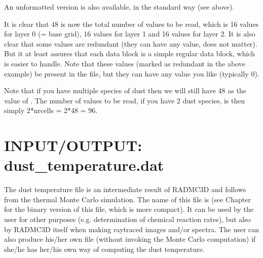 \documentclass[letterpaper,10pt,english]{sphinxmanual}
\begin{document}
\begin{sphinxVerbatim}[commandchars=\\\{\}]
\PYG{p}{[}\PYG{p}{]}
\PYG{p}{[}\PYG{p}{]}
\PYG{p}{[}\PYG{p}{]}
\PYG{p}{[}\PYG{p}{]}
\end{sphinxVerbatim}

An unformatted version is also available, in the standard way (see above).

It is clear that 48 is now the total number of values to be read, which is
16 values for layer 0 (= base grid), 16 values for layer 1 and 16 values
for layer 2. It is also clear that some values are redundant (they can
have any value, does not matter). But it at least assures that each data
block is a simple regular data block, which is easier to handle. Note that
these values (marked as redundant in the above example)  be
present in the file, but they can have any value you like (typically 0).

Note that if you have multiple species of dust then we will still have
48 as the value of . The number of values to be read,
if you have 2 dust species, is then simply 2*\textasciigrave{}\textasciigrave{}nrcells\textasciigrave{}\textasciigrave{} = 2*48 = 96.


\section{INPUT/OUTPUT: dust\_temperature.dat}
\label{\detokenize{inputoutputfiles:input-output-dust-temperature-dat}}
The dust temperature file is an intermediate result of RADMC\sphinxhyphen{}3D and follows from
the thermal Monte Carlo simulation. The name of this file is
 (see Chapter {\hyperref[\detokenize{binaryio:chap-binary-io}]{}} for the binary
version of this file, which is more compact). It can be used by the user for
other purposes (e.g. determination of chemical reaction rates), but also by
RADMC\sphinxhyphen{}3D itself when making ray\sphinxhyphen{}traced images and/or spectra. The user can also
produce his/her own  file (without invoking the Monte
Carlo computation) if she/he has her/his own way of computing the dust
temperature.
\end{document}
